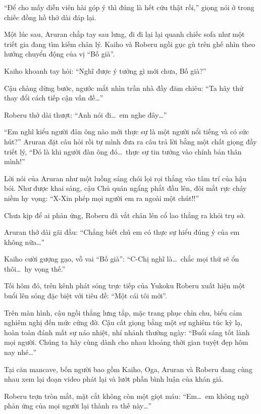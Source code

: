 \documentclass[../main.tex]{subfiles}
\begin{document}
``Để cho mấy diễn viên hài góp ý thì đúng là hết cứu thật rồi,'' giọng nói ở trong chiếc đồng hồ thở dài đáp lại.

\ct

Một lúc sau, Aruran chắp tay sau lưng, đi đi lại lại quanh chiếc sofa như một triết gia đang tìm kiếm chân lý. Kaiho và Roberu ngồi gục gù trên ghế nhìn theo hướng chuyển động của vị ``Bố già''.

Kaiho khoanh tay hỏi: ``Nghĩ được ý tưởng gì mới chưa, Bố già?''

Cậu chàng dừng bước, ngước mắt nhìn trần nhà đầy đăm chiêu: ``Ta hãy thử thay đổi cách tiếp cận vấn đề\dots''

Roberu thở dài thượt: ``Anh nói đi\dots\ em nghe đây\dots''

``Em nghĩ kiểu người đàn ông nào mới thực sự là một người nổi tiếng và có sức hút?'' Aruran đặt câu hỏi rồi tự mình đưa ra câu trả lời bằng một chất giọng đầy triết lý, ``Đó là khi người đàn ông đó\dots\ thực sự tin tưởng vào chính bản thân mình!''

Lời nói của Aruran như một luồng sáng chói lọi rọi thẳng vào tâm trí của hậu bói. Như được khai sáng, cậu Chủ quán ngẩng phắt đầu lên, đôi mắt rực cháy niềm hy vọng: ``X-Xin phép mọi người em ra ngoài một chút!!''

Chưa kịp để ai phản ứng, Roberu đã vắt chân lên cổ lao thẳng ra khỏi trụ sở.

Aruran thở dài gãi đầu: ``Chẳng biết chú em có thực sự hiểu đúng ý của em không nữa\dots''

Kaiho cười gượng gạo, vỗ vai ``Bố già'': ``C-Chị nghĩ là\dots\ chắc mọi thứ sẽ ổn thôi\dots\ hy vọng thế.''

\ct

Tối hôm đó, trên kênh phát sóng trực tiếp của Yukoku Roberu xuất hiện một buổi lên sóng đặc biệt với tiêu đề: ``Một cái tôi mới''.

Trên màn hình, cậu ngồi thẳng lưng tắp, mặc trang phục chỉn chu, biểu cảm nghiêm nghị đến mức cứng đờ. Cậu cất giọng bằng một sự nghiêm túc kỳ lạ, hoàn toàn đánh mất sự náo nhiệt, nhí nhảnh thường ngày: ``Buổi sáng tốt lành mọi người. Chúng ta hãy cùng dành cho nhau khoảng thời gian tuyệt đẹp hôm nay nhé\dots''

Tại căn mancave, bốn người bao gồm Kaiho, Oga, Aruran và Roberu đang cùng nhau xem lại đoạn video phát lại và lướt phần bình luận của khán giả.


Roberu trợn tròn mắt, mặt cắt không còn một giọt máu: ``Em\dots\ em không ngờ phản ứng của mọi người lại thành ra thế này\dots''
\end{document}

